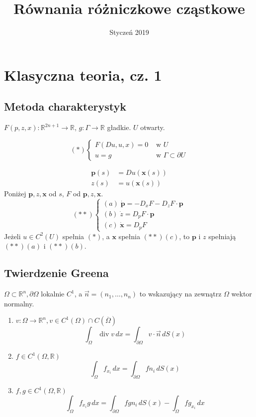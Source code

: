 \documentclass[letterpaper,12pt]{article}
\title{Równania różniczkowe cząstkowe}
\date{Styczeń 2019}
\newcommand{\R}{\mathbb{R}}
\begin{document}
\maketitle

\section{Klasyczna teoria, cz. 1}

\subsection{Metoda charakterystyk}
$F(p,z,x): \R^{2n+1} \to \R$, $g: \Gamma \to \R$ gładkie. $U$ otwarty.

$$
  (*)
  \begin{cases}
    F(Du, u, x) = 0 & \text{ w } U \\
    u = g           & \text{ w } \Gamma \subset \partial U
  \end{cases}
$$

\begin{align*}
    \mathbf{p}(s) &= Du(\mathbf{x}(s)) \\        
             z(s) &= u(\mathbf{x}(s))
\end{align*}
Poniżej $\mathbf{p}, z, \mathbf{x}$ od $s$, $F$ od $\mathbf{p}, z, \mathbf{x}$.
$$
  (**)
  \begin{cases}
    (a) \; \dot{\mathbf{p}} = - D_x F - D_z F \cdot \mathbf{p} \\
    (b)  \; \dot{z} = D_p F \cdot \mathbf{p}\\
    (c)  \; \dot{\mathbf{x}} = D_p F
  \end{cases}
$$
Jeżeli $u \in C^2(U)$ spełnia $(*)$, a $\mathbf{x}$ spełnia $(**)(c)$, to $\mathbf{p}$ i $z$ spełniają $(**)(a)$ i $(**)(b)$.

\subsection{Twierdzenie Greena}
$\Omega \subset \R^n, \partial \Omega$ lokalnie $C^1$, a $\vec{n} = (n_1, \ldots, n_n)$ to wskazujący na zewnątrz $\Omega$ wektor normalny.
\begin{enumerate}
    \item $v: \Omega \to \R^n, v \in C^1(\Omega) \cap C(\overline{\Omega})$
    $$ \int_\Omega \operatorname{div} v\,dx = \int_{\partial\Omega} v \cdot \vec{n}\,dS(x) $$
    \item $f \in C^1(\Omega, \R)$
    $$ \int_\Omega f_{x_i}\,dx = \int_{\partial\Omega} f n_i \,dS(x) $$
    \item $f,g \in C^1(\Omega, \R)$
    $$ \int_\Omega f_{x_i} g\,dx = \int_{\partial\Omega} f g n_i \,dS(x)
       - \int_\Omega f g_{x_i}\,dx $$
\end{enumerate}
\end{document}

